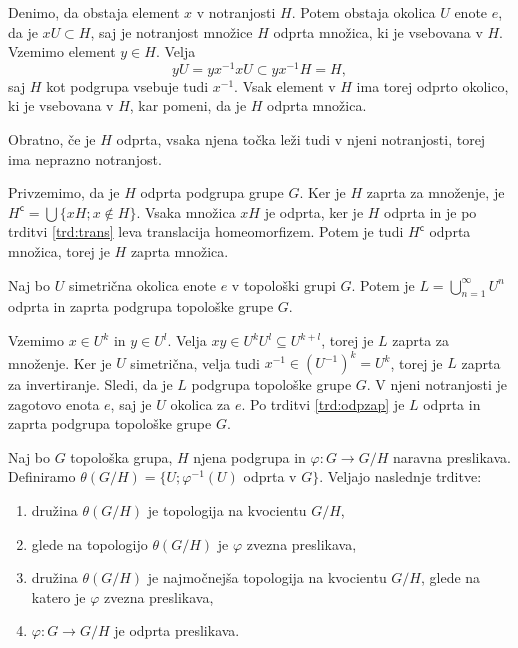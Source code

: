 \documentclass[mat1]{fmfdelo}
\newcommand{\setcomp}[1]{{#1}^{\mathsf{c}}}
\begin{document}
\begin{dokaz}
Denimo, da obstaja element $x$ v notranjosti $H$. Potem obstaja okolica $U$ enote $e$, da je $xU \subset H$, saj je notranjost množice $H$ odprta množica, ki je vsebovana v $H$. Vzemimo element $y \in H$. Velja \[yU = yx^{-1}xU \subset yx^{-1}H = H,\] saj $H$ kot podgrupa vsebuje tudi $x^{-1}$. Vsak element v $H$ ima torej odprto okolico, ki je vsebovana v $H$, kar pomeni, da je $H$ odprta množica.

Obratno, če je $H$ odprta, vsaka njena točka leži tudi v njeni notranjosti, torej ima neprazno notranjost.

Privzemimo, da je $H$ odprta podgrupa grupe $G$. Ker je $H$ zaprta za množenje, je $\setcomp{H} = \bigcup \lbrace xH ; x \notin H \rbrace$. Vsaka množica $xH$ je odprta, ker je $H$ odprta in je po trditvi \ref{trd:trans} leva translacija homeomorfizem. Potem je tudi $\setcomp{H}$ odprta množica, torej je $H$ zaprta množica.
\end{dokaz}

\begin{trditev}\label{trd:podgrupaunija}
Naj bo $U$ simetrična okolica enote $e$ v topološki grupi $G$. Potem je $L = \bigcup_{n=1}^{\infty} U^n$ odprta in zaprta podgrupa topološke grupe $G$.
\end{trditev}

\begin{dokaz}
Vzemimo $x \in U^k$ in $y \in U^l$. Velja $xy \in U^kU^l \subseteq U^{k+l}$, torej je $L$ zaprta za množenje. Ker je $U$ simetrična, velja tudi $x^{-1} \in (U^{-1})^k = U^k$, torej je $L$ zaprta za invertiranje. Sledi, da je $L$ podgrupa topološke grupe $G$. V njeni notranjosti je zagotovo enota $e$, saj je $U$ okolica za $e$. Po trditvi \ref{trd:odpzap} je $L$ odprta in zaprta podgrupa topološke grupe $G$.
\end{dokaz}


\begin{izrek}\label{izr:topkvocienta}
Naj bo $G$ topološka grupa, $H$ njena podgrupa in $\varphi\colon G \to G/H$ naravna preslikava. Definiramo $\theta(G/H) = \lbrace U ; \varphi^{-1}(U)$ odprta v $G \rbrace$.
Veljajo naslednje trditve:
\begin{enumerate}
\item družina $\theta(G/H)$ je topologija na kvocientu $G/H$,
\item glede na topologijo $\theta(G/H)$ je $\varphi$ zvezna preslikava,
\item družina $\theta(G/H)$ je najmočnejša topologija na kvocientu $G/H$, glede na katero je $\varphi$ zvezna preslikava,
\item $\varphi: G \to G/H$ je odprta preslikava.
\end{enumerate}
\end{izrek}
\end{document}
